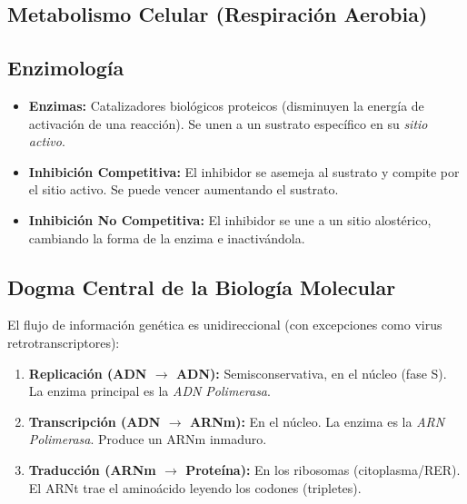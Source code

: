 \documentclass[spanish,letterpaper,oneside]{article}
\begin{document}
\subsection{Metabolismo Celular (Respiración Aerobia)}

\subsection{Enzimología}
\begin{itemize}
    \item \textbf{Enzimas:} Catalizadores biológicos proteicos (disminuyen la energía de activación de una reacción). Se unen a un sustrato específico en su \textit{sitio activo}.
    \item \textbf{Inhibición Competitiva:} El inhibidor se asemeja al sustrato y compite por el sitio activo. Se puede vencer aumentando el sustrato.
    \item \textbf{Inhibición No Competitiva:} El inhibidor se une a un sitio alostérico, cambiando la forma de la enzima e inactivándola.
\end{itemize}

\subsection{Dogma Central de la Biología Molecular}
El flujo de información genética es unidireccional (con excepciones como virus retrotranscriptores):
\begin{enumerate}
    \item \textbf{Replicación (ADN $\rightarrow$ ADN):} Semisconservativa, en el núcleo (fase S). La enzima principal es la \textit{ADN Polimerasa}.
    \item \textbf{Transcripción (ADN $\rightarrow$ ARNm):} En el núcleo. La enzima es la \textit{ARN Polimerasa}. Produce un ARNm inmaduro.
    \item \textbf{Traducción (ARNm $\rightarrow$ Proteína):} En los ribosomas (citoplasma/RER). El ARNt trae el aminoácido leyendo los codones (tripletes).
\end{enumerate}
\end{document}
